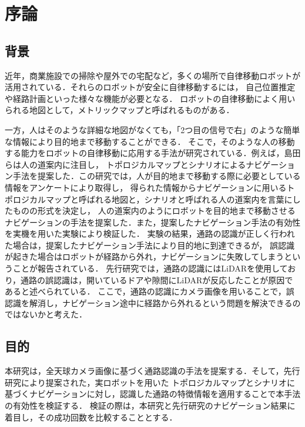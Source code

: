 \documentclass[../main]{subfiles}
\begin{document}
    \setcounter{secnumdepth}{2}
    \chapter{序論}
        \section{背景}
        近年，商業施設での掃除や屋外での宅配など，多くの場所で自律移動ロボットが活用されている．それらのロボットが安全に自律移動するには，
        自己位置推定や経路計画といった様々な機能が必要となる．
        ロボットの自律移動によく用いられる地図として，メトリックマップと呼ばれるものがある．
        
        
        一方，人はそのような詳細な地図がなくても，「2つ目の信号で右」のような簡単な情報により目的地まで移動することができる．
        そこで，そのような人の移動する能力をロボットの自律移動に応用する手法が研究されている．例えば，島田らは人の道案内に注目し，
        トポロジカルマップとシナリオによるナビゲーション手法を提案した．この研究では，人が目的地まで移動する際に必要としている情報をアンケートにより取得し，
        得られた情報からナビゲーションに用いるトポロジカルマップと呼ばれる地図と，シナリオと呼ばれる人の道案内を言葉にしたものの形式を決定し，
        人の道案内のようにロボットを目的地まで移動させるナビゲーションの手法を提案した．また，提案したナビゲーション手法の有効性を実機を用いた実験により検証した．
        実験の結果，通路の認識が正しく行われた場合は，提案したナビゲーション手法により目的地に到達できるが，
        誤認識が起きた場合はロボットが経路から外れ，ナビゲーションに失敗してしまうということが報告されている．
        先行研究では，通路の認識にはLiDARを使用しており，通路の誤認識は，開いているドアや隙間にLiDARが反応したことが原因であると述べられている．
        ここで，通路の認識にカメラ画像を用いることで，誤認識を解消し，ナビゲーション途中に経路から外れるという問題を解決できるのではないかと考えた．

        \newpage

        \section{目的}
        本研究は，全天球カメラ画像に基づく通路認識の手法を提案する．そして，先行研究により提案された，実ロボットを用いた
        トポロジカルマップとシナリオに基づくナビゲーションに対し，認識した通路の特徴情報を適用することで本手法の有効性を検証する．
        検証の際は，本研究と先行研究のナビゲーション結果に着目し，その成功回数を比較することとする．
\end{document}
